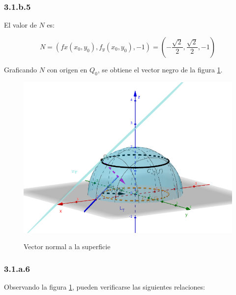 \documentclass{article}
\begin{document}
\subsubsection*{3.1.b.5}
\label{subsubsec:3.1.b.5}

El valor de $N$ es:

\begin{equation}
N = (fx(x_0,y_0), f_y(x_0,y_0), -1) = \left( -\frac{\sqrt{2}}{2}, \frac{\sqrt{2}}{2}, -1 \right)
\end{equation}

Graficando $N$ con origen en $Q_0$, se obtiene el vector negro de la figura \ref{fig:1-b-5}.

\begin{figure}[ht]
\caption{Vector normal a la superficie}
\includegraphics[scale=0.35]{img/ejercicios/3/1-b-5.png} 
\centering
\label{fig:1-b-5}
\end{figure}

\subsubsection*{3.1.a.6}
\label{subsubsec:3.1.a.6}

Observando la figura \ref{fig:1-b-5}, pueden verificarse las siguientes relaciones:
\end{document}
